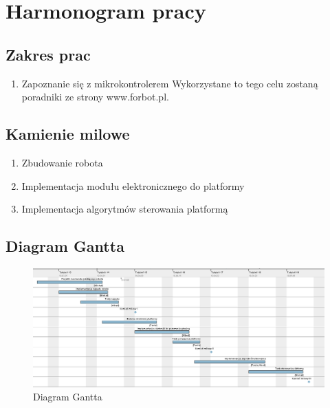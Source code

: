 \documentclass[10pt, a4paper]{article}
\begin{document}
\section{Harmonogram pracy}

\subsection{Zakres prac}
\begin{enumerate}
	\item Zapoznanie się z mikrokontrolerem
	\newline
	Wykorzystane to tego celu zostaną poradniki ze strony www.forbot.pl.
\end{enumerate}
\subsection{Kamienie milowe}
\begin{enumerate}
	\item Zbudowanie robota
	\item Implementacja modułu elektronicznego do platformy
	\item Implementacja algorytmów sterowania platformą
\end{enumerate}

\subsection{Diagram Gantta}

	\begin{figure}[H]
		\centering
		\includegraphics[width=1.1\textwidth]{gantt.png}
		\caption{Diagram Gantta}
		\label{fig:DiagramGantta}
	\end{figure}
\end{document}
